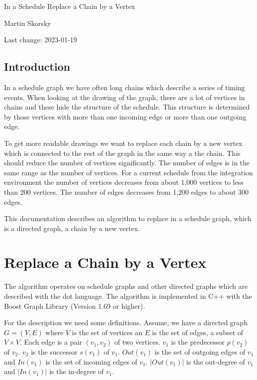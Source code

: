 \documentclass[12pt,a4paper]{report}
\begin{document}
\begin{titlepage}
\vspace{2cm}
\begin{center}
\Huge{In a Schedule Replace a Chain by a Vertex}

\Large{Martin Skorsky}

\Large{Last change: 2023-01-19}
\end{center}
\vfill
\end{titlepage}

\tableofcontents

\section*{Introduction}
In a schedule graph we have often long chains which describe a series of timing events.
When looking at the drawing of the graph, there are a lot of vertices in chains and
these hide the structure of the schedule. This structure is determined by those
vertices with more than one incoming edge or more than one outgoing edge.

To get more readable drawings we want to replace each chain by a new vertex which is
connected to the rest of the graph in the same way a the chain. This should reduce
the number of vertices significantly. The number of edges is in the same range as
the number of vertices. For a current schedule from the integration environment
the number of vertices decreases from about 1,000 vertices to less than 200 vertices.
The number of edges decreases from 1,200 edges to about 300 edges.

This documentation describes an algorithm to replace in a schedule graph, which is a
directed graph, a chain by a new vertex.

\chapter{Replace a Chain by a Vertex}
The algorithm operates on schedule graphs and other directed graphs which are described
with the dot language.
The algorithm is implemented in C++ with the Boost Graph Library (Version 1.69 or higher).

For the description we need some definitions. Assume, we have a directed graph $G = (V,E)$ where
$V$ is the set of vertices an $E$ is the set of edges, a subset of $V \times V$. Each
edge is a pair $(v_1, v_2)$ of two vertices. $v_1$ is the predecessor $p(v_2)$ of $v_2$. $v_2$ is
the successor $s(v_1)$ of $v_1$. $Out(v_1)$ is the set of outgoing edges of $v_1$ and $In(v_1)$
is the set of incoming edges of $v_1$. $|Out(v_1)|$ is the out-degree of $v_1$ and $|In(v_1)|$
is the in-degree of $v_1$.
\end{document}
